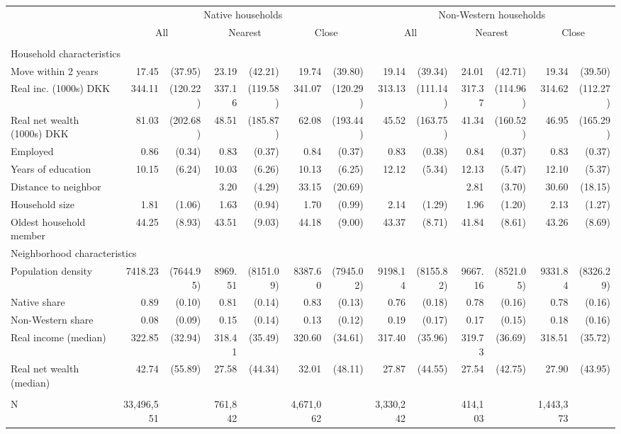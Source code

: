 \begin{tabular}{lrrrrrrrrrrrr}
\toprule
 & \multicolumn{6}{c}{Native households} & \multicolumn{6}{c}{Non-Western households} \\ 
\cmidrule(lr){2-7} \cmidrule(lr){8-13}
 & \multicolumn{2}{c}{All} & \multicolumn{2}{c}{Nearest} & \multicolumn{2}{c}{Close} & \multicolumn{2}{c}{All} & \multicolumn{2}{c}{Nearest} & \multicolumn{2}{c}{Close} \\ 
\cmidrule(lr){2-3} \cmidrule(lr){4-5} \cmidrule(lr){6-7} \cmidrule(lr){8-9} \cmidrule(lr){10-11} \cmidrule(lr){12-13}
 &  &  &  &  &  &  &  &  &  &  &  &  \\ 
\midrule
\multicolumn{13}{l}{Household characteristics} \\ 
\midrule
Move within 2 years & 17.45 & (37.95) & 23.19 & (42.21) & 19.74 & (39.80) & 19.14 & (39.34) & 24.01 & (42.71) & 19.34 & (39.50) \\ 
Real inc. (1000s) DKK & 344.11 & (120.22) & 337.16 & (119.58) & 341.07 & (120.29) & 313.13 & (111.14) & 317.37 & (114.96) & 314.62 & (112.27) \\ 
Real net wealth (1000s) DKK & 81.03 & (202.68) & 48.51 & (185.87) & 62.08 & (193.44) & 45.52 & (163.75) & 41.34 & (160.52) & 46.95 & (165.29) \\ 
Employed & 0.86 & (0.34) & 0.83 & (0.37) & 0.84 & (0.37) & 0.83 & (0.38) & 0.84 & (0.37) & 0.83 & (0.37) \\ 
Years of education & 10.15 & (6.24) & 10.03 & (6.26) & 10.13 & (6.25) & 12.12 & (5.34) & 12.13 & (5.47) & 12.10 & (5.37) \\ 
Distance to neighbor & & & 3.20 & (4.29) & 33.15 & (20.69) & & & 2.81 & (3.70) & 30.60 & (18.15) \\ 
Household size & 1.81 & (1.06) & 1.63 & (0.94) & 1.70 & (0.99) & 2.14 & (1.29) & 1.96 & (1.20) & 2.13 & (1.27) \\ 
Oldest household member & 44.25 & (8.93) & 43.51 & (9.03) & 44.18 & (9.00) & 43.37 & (8.71) & 41.84 & (8.61) & 43.26 & (8.69) \\ 
\midrule
\multicolumn{13}{l}{Neighborhood characteristics} \\ 
\midrule
Population density & 7418.23 & (7644.95) & 8969.51 & (8151.09) & 8387.60 & (7945.02) & 9198.14 & (8155.82) & 9667.16 & (8521.05) & 9331.84 & (8326.29) \\ 
Native share & 0.89 & (0.10) & 0.81 & (0.14) & 0.83 & (0.13) & 0.76 & (0.18) & 0.78 & (0.16) & 0.78 & (0.16) \\ 
Non-Western share & 0.08 & (0.09) & 0.15 & (0.14) & 0.13 & (0.12) & 0.19 & (0.17) & 0.17 & (0.15) & 0.18 & (0.16) \\ 
Real income (median) & 322.85 & (32.94) & 318.41 & (35.49) & 320.60 & (34.61) & 317.40 & (35.96) & 319.73 & (36.69) & 318.51 & (35.72) \\ 
Real net wealth (median) & 42.74 & (55.89) & 27.58 & (44.34) & 32.01 & (48.11) & 27.87 & (44.55) & 27.54 & (42.75) & 27.90 & (43.95) \\ 
\midrule
\multicolumn{13}{l}{\vspace*{-5mm}} \\ 
N & 33,496,551 &  & 761,842 &  & 4,671,062 &  & 3,330,242 &  & 414,103 &  & 1,443,373 &  \\ 
\bottomrule
\end{tabular}